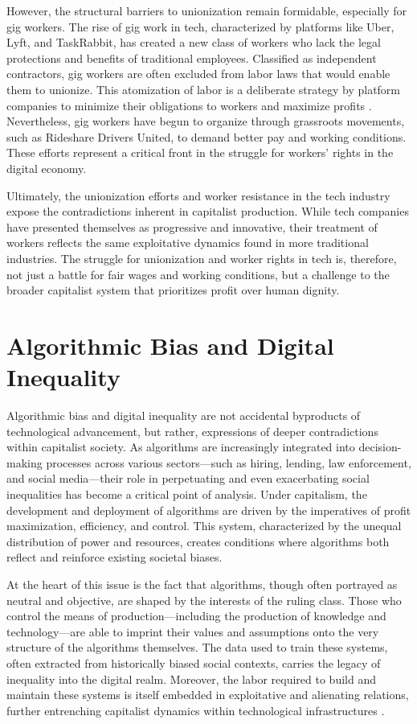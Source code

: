 \begin{refsection}
However, the structural barriers to unionization remain formidable, especially for gig workers. The rise of gig work in tech, characterized by platforms like Uber, Lyft, and TaskRabbit, has created a new class of workers who lack the legal protections and benefits of traditional employees. Classified as independent contractors, gig workers are often excluded from labor laws that would enable them to unionize. This atomization of labor is a deliberate strategy by platform companies to minimize their obligations to workers and maximize profits \cite[pp.~45-47]{ravenelle2019}. Nevertheless, gig workers have begun to organize through grassroots movements, such as Rideshare Drivers United, to demand better pay and working conditions. These efforts represent a critical front in the struggle for workers’ rights in the digital economy.

Ultimately, the unionization efforts and worker resistance in the tech industry expose the contradictions inherent in capitalist production. While tech companies have presented themselves as progressive and innovative, their treatment of workers reflects the same exploitative dynamics found in more traditional industries. The struggle for unionization and worker rights in tech is, therefore, not just a battle for fair wages and working conditions, but a challenge to the broader capitalist system that prioritizes profit over human dignity.

\section{Algorithmic Bias and Digital Inequality}

Algorithmic bias and digital inequality are not accidental byproducts of technological advancement, but rather, expressions of deeper contradictions within capitalist society. As algorithms are increasingly integrated into decision-making processes across various sectors—such as hiring, lending, law enforcement, and social media—their role in perpetuating and even exacerbating social inequalities has become a critical point of analysis. Under capitalism, the development and deployment of algorithms are driven by the imperatives of profit maximization, efficiency, and control. This system, characterized by the unequal distribution of power and resources, creates conditions where algorithms both reflect and reinforce existing societal biases.

At the heart of this issue is the fact that algorithms, though often portrayed as neutral and objective, are shaped by the interests of the ruling class. Those who control the means of production—including the production of knowledge and technology—are able to imprint their values and assumptions onto the very structure of the algorithms themselves. The data used to train these systems, often extracted from historically biased social contexts, carries the legacy of inequality into the digital realm. Moreover, the labor required to build and maintain these systems is itself embedded in exploitative and alienating relations, further entrenching capitalist dynamics within technological infrastructures \cite[pp.~89-91]{noble2018}.


\end{refsection}
